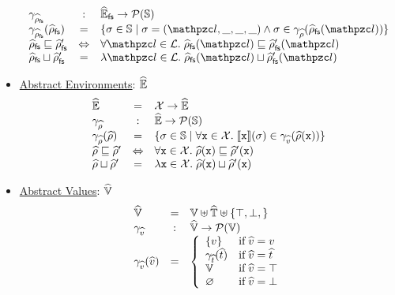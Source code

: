 \documentclass[10pt,conference]{IEEEtran}
\begin{document}
\begin{itemize}
\[\begin{array}{lcl}
        \afsenvgamma &:& \afsenvset \rightarrow \powerset{\stset}\\

        \afsenvgamma(\afsenv) &=& \{ \st \in \stset \mid
          \st = (\lab, \_, \_, \_) \wedge \st \in \aenvgamma(\afsenv(\lab))
        \}\\

        \afsenv \order \afsenv' &\Leftrightarrow&
        \forall \lab \in \labset. \; \afsenv(\lab) \order \afsenv'(\lab)\\

        \afsenv \join \afsenv' &=&
        \lambda \lab \in \labset. \; \afsenv(\lab) \join \afsenv'(\lab)\\
      \end{array}
    \]

  \item \underline{Abstract Environments}: $\widehat{\mathbb{E}}$
    \[
      \begin{array}{lcl}
        \aenvset &=& \varset \rightarrow \aenvset\\

        \aenvgamma &:& \aenvset \rightarrow \powerset{\stset}\\

        \aenvgamma(\aenv) &=& \{ \st \in \stset \mid
          \forall \varx \in \varset. \;
          \sem{\varx}(\st) \in \avalgamma(\aenv(\varx))
        \}\\

        \aenv \order \aenv' &\Leftrightarrow&
        \forall \varx \in \varset. \;
        \aenv(\varx) \order \aenv'(\varx)\\

        \aenv \join \aenv' &=&
        \lambda \varx \in \varset. \;
        \aenv(\varx) \join \aenv'(\varx)\\
      \end{array}
    \]

  \item \underline{Abstract Values}: $\widehat{\mathbb{V}}$
    \[
      \begin{array}{lcl}
        \widehat{\mathbb{V}} &=& \mathbb{V} \uplus \widehat{\mathbb{T}} \uplus \{ \top, \bot,  \}\\

        \gamma_{\widehat{v}} &:& \widehat{\mathbb{V}} \rightarrow \mathcal{P}(\mathbb{V})\\

        \gamma_{\widehat{v}}(\widehat{v}) &=& \left\{
          \begin{array}{ll}
            \{ v \} & \text{if} \; \widehat{v} = v\\
            \gamma_{\widehat{t}}(\widehat{t}) & \text{if} \; \widehat{v} = \widehat{t}\\
            \mathbb{V} & \text{if} \; \widehat{v} = \top\\
            \varnothing & \text{if} \; \widehat{v} = \bot\\
          \end{array}
        \right.\\


\end{array}\]
\end{itemize}
\end{document}
